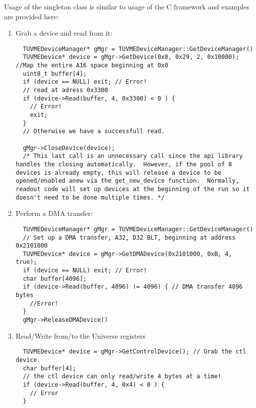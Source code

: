 Usage of the singleton class is
similar to usage of the C framework and examples are provided here: 
			\begin{enumerate}
			\item Grab a device and read from it:
				\begin{lstlisting}
  TUVMEDeviceManager* gMgr = TUVMEDeviceManager::GetDeviceManager()
  TUVMEDevice* device = gMgr->GetDevice(0x0, 0x29, 2, 0x10000); //Map the entire A16 space beginning at 0x0
  uint8_t buffer[4];
  if (device == NULL) exit; // Error!
  // read at adress 0x3300 
  if (device->Read(buffer, 4, 0x3300) < 0 ) { 
    // Error!
    exit;
  }
  // Otherwise we have a successfull read.

  gMgr->CloseDevice(device);  
  /* This last call is an unnecessary call since the api library handles the closing automatically.  However, if the pool of 8 devices is already empty, this will release a device to be opened/enabled anew via the get_new_device function.  Normally, readout code will set up devices at the beginning of the run so it doesn't need to be done multiple times. */

				\end{lstlisting}
			\item Perform a DMA transfer:
				\begin{lstlisting}
  TUVMEDeviceManager* gMgr = TUVMEDeviceManager::GetDeviceManager()
  // Set up a DMA transfer, A32, D32 BLT, beginning at address 0x2101000
  TUVMEDevice* device = gMgr->GetDMADevice(0x2101000, 0xB, 4, true); 
  if (device == NULL) exit; // Error!
  char buffer[4096]; 
  if (device->Read(buffer, 4096) != 4096) { // DMA transfer 4096 bytes
    //Error!
  }
  gMgr->ReleaseDMADevice()
				\end{lstlisting}
  			\item Read/Write from/to the Universe registers

				\begin{lstlisting}
  TUVMEDevice* device = gMgr->GetControlDevice(); // Grab the ctl device. 
  char buffer[4];
  // the ctl device can only read/write 4 bytes at a time!
  if (device->Read(buffer, 4, 0x4) < 0 ) { 
    // Error
  } 
				\end{lstlisting}

			\end{enumerate}





